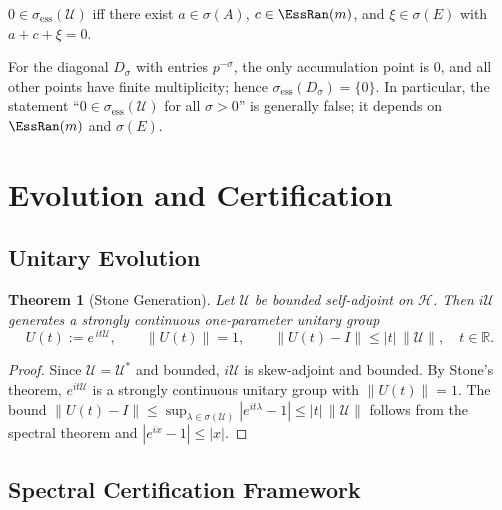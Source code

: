\documentclass[12]{amsart}
\newtheorem{theorem}{Theorem}
\theoremstyle{plain}
\begin{document}
\begin{corollary}\label{cor:zero-in-ess}
$0\in\sigma_{\mathrm{ess}}(\mathcal U)$ iff there exist $a\in\sigma(A)$, $c\in\EssRan(m)$, and $\xi\in\sigma(E)$ with $a+c+\xi=0$.
\end{corollary}

\begin{remark}
For the diagonal $D_\sigma$ with entries $p^{-\sigma}$, the only accumulation point is $0$, and all other points have finite multiplicity; hence $\sigma_{\mathrm{ess}}(D_\sigma)=\{0\}$.
In particular, the statement “$0\in\sigma_{\mathrm{ess}}(\mathcal U)$ for all $\sigma>0$” is generally false; it depends on $\EssRan(m)$ and $\sigma(E)$.
\end{remark}


\section{Evolution and Certification}

\subsection{Unitary Evolution}

\begin{theorem}[Stone Generation]
Let $\mathcal U$ be bounded self-adjoint on $\mathcal H$. Then $i\mathcal U$ generates a strongly continuous one-parameter unitary group
\[
U(t):=e^{\,it\mathcal U},\qquad \|U(t)\|=1,\qquad \|U(t)-I\|\le |t|\,\|\mathcal U\|,\quad t\in\mathbb R.
\]
\end{theorem}

\begin{proof}
Since $\mathcal U=\mathcal U^\ast$ and bounded, $i\mathcal U$ is skew-adjoint and bounded. By Stone's theorem, $e^{it\mathcal U}$ is a strongly continuous unitary group with $\|U(t)\|=1$. The bound $\|U(t)-I\|\le \sup_{\lambda\in\sigma(\mathcal U)}|e^{it\lambda}-1|\le |t|\,\|\mathcal U\|$ follows from the spectral theorem and $|e^{ix}-1|\le |x|$.
\end{proof}

\subsection{Spectral Certification Framework}
\end{document}
